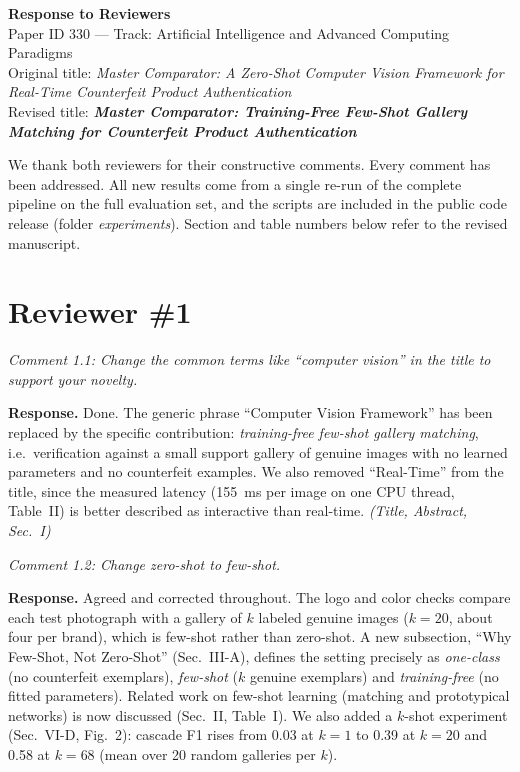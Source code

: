\documentclass[10pt,a4paper]{article}
\newenvironment{comment}{\par\medskip\noindent\begin{minipage}{\linewidth}\color{black!70}\itshape}{\end{minipage}\par\smallskip}
\begin{document}
{\Large\bfseries Response to Reviewers}\\[2pt]
Paper ID 330 --- Track: Artificial Intelligence and Advanced Computing Paradigms\\
Original title: \emph{Master Comparator: A Zero-Shot Computer Vision Framework for Real-Time Counterfeit Product Authentication}\\
Revised title: \textbf{\emph{Master Comparator: Training-Free Few-Shot Gallery Matching for Counterfeit Product Authentication}}

We thank both reviewers for their constructive comments. Every comment has been addressed. All new results come from a single re-run of the complete pipeline on the full evaluation set, and the scripts are included in the public code release (folder \emph{experiments}). Section and table numbers below refer to the revised manuscript.

\section*{Reviewer \#1}

\begin{comment}Comment 1.1: Change the common terms like ``computer vision'' in the title to support your novelty.\end{comment}
\textbf{Response.} Done. The generic phrase ``Computer Vision Framework'' has been replaced by the specific contribution: \emph{training-free few-shot gallery matching}, i.e.\ verification against a small support gallery of genuine images with no learned parameters and no counterfeit examples. We also removed ``Real-Time'' from the title, since the measured latency (155~ms per image on one CPU thread, Table~II) is better described as interactive than real-time. \emph{(Title, Abstract, Sec.~I)}

\begin{comment}Comment 1.2: Change zero-shot to few-shot.\end{comment}
\textbf{Response.} Agreed and corrected throughout. The logo and color checks compare each test photograph with a gallery of $k$ labeled genuine images ($k{=}20$, about four per brand), which is few-shot rather than zero-shot. A new subsection, ``Why Few-Shot, Not Zero-Shot'' (Sec.~III-A), defines the setting precisely as \emph{one-class} (no counterfeit exemplars), \emph{few-shot} ($k$ genuine exemplars) and \emph{training-free} (no fitted parameters). Related work on few-shot learning (matching and prototypical networks) is now discussed (Sec.~II, Table~I). We also added a $k$-shot experiment (Sec.~VI-D, Fig.~2): cascade F1 rises from 0.03 at $k{=}1$ to 0.39 at $k{=}20$ and 0.58 at $k{=}68$ (mean over 20 random galleries per $k$).
\end{document}
